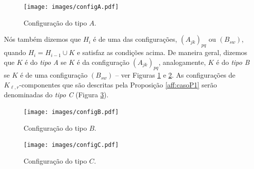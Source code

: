 \documentclass[12pt,a4paper]{book}
\newcommand{\K}{K_{\ell,r}} %
\begin{document}
  \begin{figure}[htb] \centering \texttt{[image: images/configA.pdf]}
   \caption{Configuração do tipo $A$.}
   \label{fig:configA}
 \end{figure}

    Nós também dizemos que $H_i$ é de uma das configurações, $(A_{jk})_{pq}$ ou $(B_{sw})$, 
    quando $H_i = H_{i-1} \cup K$ e satisfaz as condições acima. 
	De maneira geral, dizemos que $K$ é do \textit{tipo A} se $K$ é da configuração $(A_{jk})_{pq}$, analogamente,
		$K$ é do \textit{tipo B} se $K$ é de uma configuração $(B_{sw})$ -- ver Figuras \ref{fig:configA} e \ref{fig:configB}.
    As configurações de $\K$-componentes que são descritas pela Proposição \ref{aff:casoP1} serão denominadas do \textit{tipo C} (Figura \ref{fig:configC}).
  

  
 \begin{figure}[htb] \centering \texttt{[image: images/configB.pdf]}
   \caption{Configuração do tipo $B$.}
   \label{fig:configB}
 \end{figure}

   \begin{figure}[htb] \centering \texttt{[image: images/configC.pdf]}
   \caption{Configuração do tipo $C$.}
   \label{fig:configC}
 \end{figure}
\end{document}
